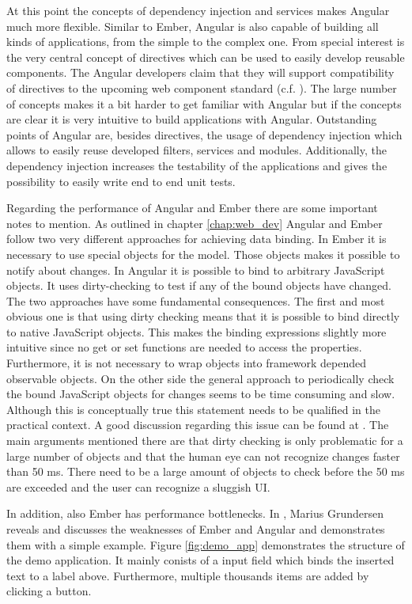 At this point the concepts of dependency injection and services makes Angular much more flexible.
Similar to Ember, Angular is also capable of building all kinds of applications, from the simple to the complex one.
From special interest is the very central concept of directives which can be used to easily develop reusable components. The Angular developers claim that they will support compatibility of directives to the upcoming web component standard (c.f. \autocite{tech-ana:ng-web-components}).
The large number of concepts makes it a bit harder to get familiar with Angular but if the concepts are clear it is very intuitive to build applications with Angular.
Outstanding points of Angular are, besides directives, the usage of dependency injection which allows to easily reuse developed filters, services and modules. 
Additionally, the dependency injection increases the testability of the applications and gives the possibility to easily write end to end unit tests. 

Regarding the performance of Angular and Ember there are some important notes to mention. As outlined in chapter \ref{chap:web_dev} Angular and Ember follow two very different approaches for achieving data binding. 
In Ember it is necessary to use special objects for the model. Those objects makes it possible to notify about changes. 
In Angular it is possible to bind to arbitrary JavaScript objects. 
It uses dirty-checking to test if any of the bound objects have changed.
The two approaches have some fundamental consequences.
The first and most obvious one is that using dirty checking means that it is possible to bind directly to native JavaScript objects.
This makes the binding expressions slightly more intuitive since no get or set functions are needed to access the properties.
Furthermore, it is not necessary to wrap objects into framework depended observable objects.
On the other side the general approach to periodically check the bound JavaScript objects for changes seems to be time consuming and slow.
Although this is conceptually true this statement needs to be qualified in the practical context.
A good discussion regarding this issue can be found at \autocite{tech-ana:ng-binding}.
The main arguments mentioned there are that dirty checking is only problematic for a large number of objects and that the human eye can not recognize changes faster than 50 ms.
There need to be a large amount of objects to check before the 50 ms are exceeded and the user can recognize a sluggish UI.

In addition, also Ember has performance bottlenecks. 
In \autocite{binding_comparison}, Marius Grundersen reveals and discusses the weaknesses of Ember and Angular and demonstrates them with a simple example. 
Figure \ref{fig:demo_app} demonstrates the structure of the demo application. It mainly conists of a input field which binds the inserted text to a label above. 
Furthermore, multiple thousands items are added by clicking a button. 

